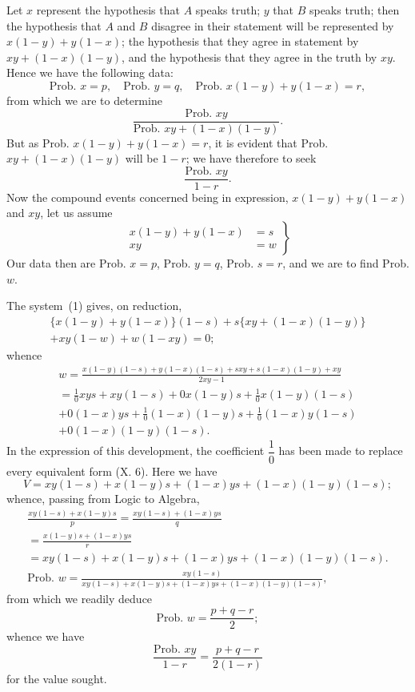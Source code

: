 \documentclass[oneside]{book}
\begin{document}
Let $x$ represent the hypothesis that $A$ speaks truth; $y$ that
$B$ speaks truth; then the hypothesis that $A$ and $B$ disagree in
their statement will be represented by $x(1-y) + y(1-x)$; the
hypothesis that they agree in statement by $xy + (1-x)(1-y)$,
and the hypothesis that they agree in the truth by $xy$. Hence
we have the following data:
\[
  \text{Prob. } x = p,\quad \text{Prob. } y = q,\quad
  \text{Prob. } x(1-y) + y(1-x) = r,
\]
from which we are to determine
\[
  \frac{ \text{Prob. } xy }{ \text{Prob. } xy + (1-x)(1-y) }.
\]
But as Prob. $x(1-y) + y(1-x) = r$, it is evident that Prob.
$xy + (1-x)(1-y)$ will be $1-r$; we have therefore to seek
\[
  \frac{ \text{Prob. } xy }{1-r}.
\]
Now the compound events concerned being in expression,
$x(1-y) + y(1-x)$ and $xy$, let us assume
\[
\left.
\begin{array}{cl}
  x(1-y) + y(1-x) &= s   \\
  xy              &= w
\end{array}
\right\}   \tag{1}
\]
Our data then are Prob. $x = p$, Prob. $y = q$, Prob. $s = r$, and we
are to find Prob. $w$.

The system~(1) gives, on reduction,
\begin{multline*}
  \{x(1-y) + y(1-x)\}(1-s) + s\{xy + (1-x)(1-y)\}   \\
  + xy(1-w) + w(1-xy) = 0;
\end{multline*}
whence
\begin{gather*}
w  = \frac{x(1-y)(1-s) + y(1-x)(1-s) + sxy + s(1-x)(1-y) + xy}{2xy-1}\\
   = \frac{1}{0}xys + xy(1-s) + 0x(1-y)s + \frac{1}{0}x(1-y)(1-s) \\
   + 0(1-x)ys + \frac{1}{0}(1-x)(1-y)s + \frac{1}{0}(1-x)y(1-s)
\tag{2} \\
   + 0(1-x)(1-y)(1-s).
\end{gather*}
In the expression of this development, the coefficient $\dfrac{1}{0}$ has been
made to replace every equivalent form (X. 6). Here we have
\[
  V = xy(1-s) + x(1-y)s + (1-x)ys + (1-x)(1-y)(1-s);
\]
whence, passing from Logic to Algebra,
\begin{gather*}
    \frac{xy(1-s) + x(1-y)s}{p} = \frac{xy(1-s) + (1-x)ys}{q}   \\
  = \frac{x(1-y)s + (1-x)ys}{r}\\
= xy(1-s) + x(1-y)s + (1-x)ys + (1-x)(1-y)(1-s).   \\
  \textrm{Prob. }w
= \frac{xy(1-s)}{xy(1-s) + x(1-y)s + (1-x)ys + (1-x)(1-y)(1-s)},
\end{gather*}
from which we readily deduce
\[
  \textrm{Prob. }w = \frac{p+q-r}{2};
\]
whence we have
\[
  \frac{ \text{Prob. }xy }{1-r} = \frac{p+q-r}{2(1-r)}  \tag{3}
\]
for the value sought.
\end{document}

